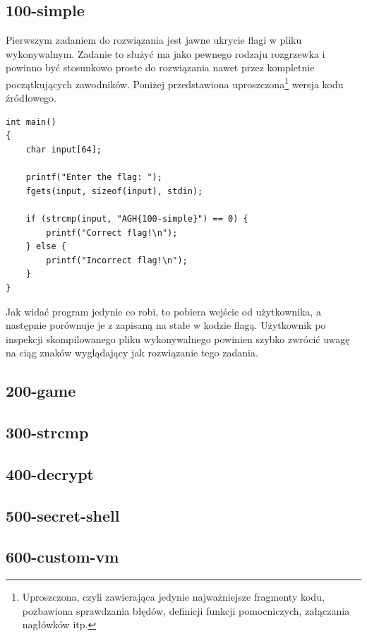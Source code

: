 \documentclass[polish,12pt]{aghthesis}
\begin{document}
\subsection{100-simple}

Pierwszym zadaniem do rozwiązania jest jawne ukrycie flagi w pliku wykonywalnym.
Zadanie to służyć ma jako pewnego rodzaju rozgrzewka i powinno być stosunkowo
proste do rozwiązania nawet przez kompletnie początkujących zawodników.
Poniżej przedstawiona uproszczona\footnote{Uproszczona, czyli zawierająca jedynie
najważniejsze fragmenty kodu, pozbawiona sprawdzania błędów, definicji funkcji
pomocniczych, załączania nagłówków itp.} wersja kodu źródłowego.

\begin{verbatim}
int main()
{
    char input[64];

    printf("Enter the flag: ");
    fgets(input, sizeof(input), stdin);

    if (strcmp(input, "AGH{100-simple}") == 0) {
        printf("Correct flag!\n");
    } else {
        printf("Incorrect flag!\n");
    }
}
\end{verbatim}

Jak widać program jedynie co robi, to pobiera wejście od użytkownika, a następnie
porównuje je z zapisaną na stałe w kodzie flagą. Użytkownik po inspekcji skompilowanego
pliku wykonywalnego powinien szybko zwrócić uwagę na ciąg znaków wyglądający jak
rozwiązanie tego zadania.

\subsection{200-game}

\subsection{300-strcmp}

\subsection{400-decrypt}

\subsection{500-secret-shell}

\subsection{600-custom-vm}
\end{document}
